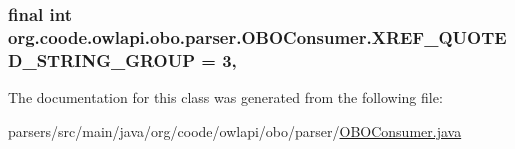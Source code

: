 \hypertarget{classorg_1_1coode_1_1owlapi_1_1obo_1_1parser_1_1_o_b_o_consumer_add3429e6d074701321701c0205751b61}{
\subsubsection[{X\-R\-E\-F\-\_\-\-Q\-U\-O\-T\-E\-D\-\_\-\-S\-T\-R\-I\-N\-G\-\_\-\-G\-R\-O\-U\-P}]{\setlength{\rightskip}{0pt plus 5cm}final int org.\-coode.\-owlapi.\-obo.\-parser.\-O\-B\-O\-Consumer.\-X\-R\-E\-F\-\_\-\-Q\-U\-O\-T\-E\-D\-\_\-\-S\-T\-R\-I\-N\-G\-\_\-\-G\-R\-O\-U\-P = 3\hspace{0.3cm}{\ttfamily [static]}, {\ttfamily [private]}}}\label{classorg_1_1coode_1_1owlapi_1_1obo_1_1parser_1_1_o_b_o_consumer_add3429e6d074701321701c0205751b61}


The documentation for this class was generated from the following file\-:\begin{DoxyCompactItemize}
\item 
parsers/src/main/java/org/coode/owlapi/obo/parser/\hyperlink{_o_b_o_consumer_8java}{O\-B\-O\-Consumer.\-java}\end{DoxyCompactItemize}
